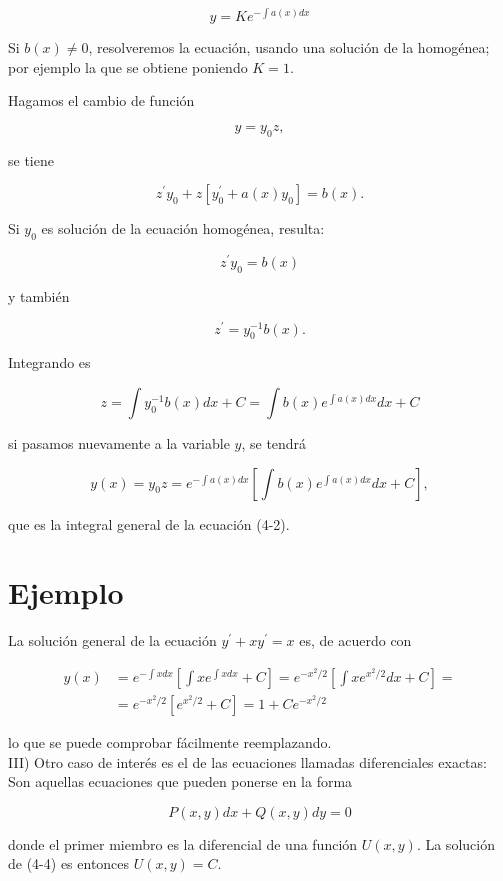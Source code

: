 \documentclass[10pt]{article}
\theoremstyle{plain}
\theoremstyle{definition}
\theoremstyle{remark}
\begin{document}
$$
y=K e^{-\int a(x) d x}
$$


Si $b(x) \neq 0$, resolveremos la ecuación, usando una solución de la homogénea; por ejemplo la que se obtiene poniendo $K=1$.

Hagamos el cambio de función

$$
y=y_{0} z,
$$

se tiene

$$
z^{\prime} y_{0}+z\left[y_{0}^{\prime}+a(x) y_{0}\right]=b(x) .
$$

Si $y_{0}$ es solución de la ecuación homogénea, resulta:

$$
z^{\prime} y_{0}=b(x)
$$

y también

$$
z^{\prime}=y_{0}^{-1} b(x) .
$$

Integrando es

$$
z=\int y_{0}^{-1} b(x) d x+C=\int b(x) e^{\int a(x) d x} d x+C
$$

si pasamos nuevamente a la variable $y$, se tendrá


\begin{equation*}
y(x)=y_{0} z=e^{-\int a(x) d x}\left[\int b(x) e^{\int a(x) d x} d x+C\right], \tag{4-3}
\end{equation*}


que es la integral general de la ecuación (4-2).

\section*{Ejemplo}
La solución general de la ecuación $y^{\prime}+x y^{\prime}=x$ es, de acuerdo con

$$
\begin{aligned}
y(x) & =e^{-\int x d x}\left[\int x e^{\int x d x}+C\right]=e^{-x^{2} / 2}\left[\int x e^{x^{2} / 2} d x+C\right]= \\
& =e^{-x^{2} / 2}\left[e^{x^{2} / 2}+C\right]=1+C e^{-x^{2} / 2}
\end{aligned}
$$

lo que se puede comprobar fácilmente reemplazando.\\
III) Otro caso de interés es el de las ecuaciones llamadas diferenciales exactas: Son aquellas ecuaciones que pueden ponerse en la forma


\begin{equation*}
P(x, y) d x+Q(x, y) d y=0 \tag{4-4}
\end{equation*}


donde el primer miembro es la diferencial de una función $U(x, y)$. La solución de (4-4) es entonces $U(x, y)=C$.
\end{document}
